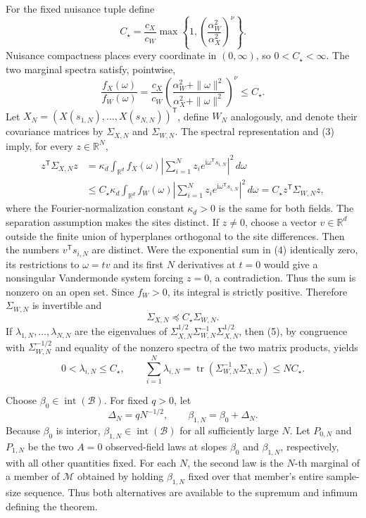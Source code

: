 For the fixed nuisance tuple define
\[
 C_\star=\frac{c_X}{c_W}
 \max\left\{1,\left(\frac{\alpha_W^2}{\alpha_X^2}\right)^\nu\right\}.
 \tag{2}
\]
Nuisance compactness places every coordinate in \((0,\infty)\), so \(0<C_\star<\infty\).  The two marginal spectra satisfy, pointwise,
\[
 \frac{f_X(\omega)}{f_W(\omega)}
 =\frac{c_X}{c_W}
 \left(\frac{\alpha_W^2+\|\omega\|^2}
 {\alpha_X^2+\|\omega\|^2}\right)^\nu
 \leq C_\star.
 \tag{3}
\]
Let \(X_N=(X(s_{1,N}),\ldots,X(s_{N,N}))^{\mathsf T}\), define \(W_N\) analogously, and denote their covariance matrices by \(\Sigma_{X,N}\) and \(\Sigma_{W,N}\).  The spectral representation and (3) imply, for every \(z\in\mathbb R^N\),
\[
 \begin{aligned}
 z^{\mathsf T}\Sigma_{X,N}z
 &=\kappa_d\int_{\mathbb R^d}f_X(\omega)
 \left|\sum_{i=1}^Nz_i e^{\mathrm i\omega^{\mathsf T}s_{i,N}}\right|^2\,d\omega\\
 &\leq C_\star\kappa_d\int_{\mathbb R^d}f_W(\omega)
 \left|\sum_{i=1}^Nz_i e^{\mathrm i\omega^{\mathsf T}s_{i,N}}\right|^2\,d\omega
 =C_\star z^{\mathsf T}\Sigma_{W,N}z,
 \end{aligned}
 \tag{4}
\]
where the Fourier-normalization constant \(\kappa_d>0\) is the same for both fields.  The separation assumption makes the sites distinct.  If \(z\neq0\), choose a vector \(v\in\mathbb R^d\) outside the finite union of hyperplanes orthogonal to the site differences.  Then the numbers \(v^{\mathsf T}s_{i,N}\) are distinct.  Were the exponential sum in (4) identically zero, its restrictions to \(\omega=tv\) and its first \(N\) derivatives at \(t=0\) would give a nonsingular Vandermonde system forcing \(z=0\), a contradiction.  Thus the sum is nonzero on an open set.  Since \(f_W>0\), its integral is strictly positive.  Therefore \(\Sigma_{W,N}\) is invertible and
\[
 \Sigma_{X,N}\preceq C_\star\Sigma_{W,N}.
 \tag{5}
\]
If \(\lambda_{1,N},\ldots,\lambda_{N,N}\) are the eigenvalues of
\(\Sigma_{X,N}^{1/2}\Sigma_{W,N}^{-1}\Sigma_{X,N}^{1/2}\), then (5), by congruence with \(\Sigma_{W,N}^{-1/2}\) and equality of the nonzero spectra of the two matrix products, yields
\[
 0<\lambda_{i,N}\leq C_\star,
 \qquad
 \sum_{i=1}^N\lambda_{i,N}
 =\operatorname{tr}(\Sigma_{W,N}^{-1}\Sigma_{X,N})
 \leq NC_\star.
 \tag{6}
\]

Choose \(\beta_0\in\operatorname{int}(\mathcal B)\).  For fixed \(q>0\), let
\[
 \Delta_N=qN^{-1/2},\qquad \beta_{1,N}=\beta_0+\Delta_N.
 \tag{7}
\]
Because \(\beta_0\) is interior, \(\beta_{1,N}\in\operatorname{int}(\mathcal B)\) for all sufficiently large \(N\).  Let \(P_{0,N}\) and \(P_{1,N}\) be the two \(A=0\) observed-field laws at slopes \(\beta_0\) and \(\beta_{1,N}\), respectively, with all other quantities fixed.  For each \(N\), the second law is the \(N\)-th marginal of a member of \(\mathcal M\) obtained by holding \(\beta_{1,N}\) fixed over that member's entire sample-size sequence.  Thus both alternatives are available to the supremum and infimum defining the theorem.

